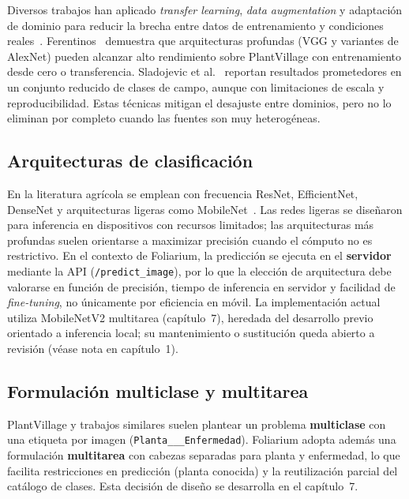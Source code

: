 \documentclass[11pt,spanish,listoffigures,listoftables]{tfgetsinf}
\begin{document}
Diversos trabajos han aplicado \textit{transfer learning}, \textit{data augmentation} y adaptación de dominio para reducir la brecha entre datos de entrenamiento y condiciones reales~\cite{ferentinos2018,sladojevic2016}. Ferentinos~\cite{ferentinos2018} demuestra que arquitecturas profundas (VGG y variantes de AlexNet) pueden alcanzar alto rendimiento sobre PlantVillage con entrenamiento desde cero o transferencia. Sladojevic et al.~\cite{sladojevic2016} reportan resultados prometedores en un conjunto reducido de clases de campo, aunque con limitaciones de escala y reproducibilidad. Estas técnicas mitigan el desajuste entre dominios, pero no lo eliminan por completo cuando las fuentes son muy heterogéneas.

\subsection{Arquitecturas de clasificación}

En la literatura agrícola se emplean con frecuencia ResNet, EfficientNet, DenseNet y arquitecturas ligeras como MobileNet~\cite{mobilenetv2}. Las redes ligeras se diseñaron para inferencia en dispositivos con recursos limitados; las arquitecturas más profundas suelen orientarse a maximizar precisión cuando el cómputo no es restrictivo. En el contexto de Foliarium, la predicción se ejecuta en el \textbf{servidor} mediante la API (\texttt{/predict\_image}), por lo que la elección de arquitectura debe valorarse en función de precisión, tiempo de inferencia en servidor y facilidad de \textit{fine-tuning}, no únicamente por eficiencia en móvil. La implementación actual utiliza MobileNetV2 multitarea (capítulo~7), heredada del desarrollo previo orientado a inferencia local; su mantenimiento o sustitución queda abierto a revisión (véase nota en capítulo~1).

\subsection{Formulación multiclase y multitarea}

PlantVillage y trabajos similares suelen plantear un problema \textbf{multiclase} con una etiqueta por imagen (\texttt{Planta\_\_\_Enfermedad}). Foliarium adopta además una formulación \textbf{multitarea} con cabezas separadas para planta y enfermedad, lo que facilita restricciones en predicción (planta conocida) y la reutilización parcial del catálogo de clases. Esta decisión de diseño se desarrolla en el capítulo~7.
\end{document}
